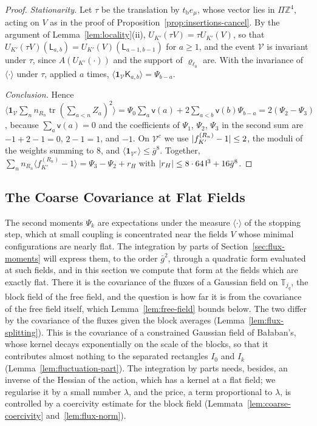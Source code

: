 \documentclass[11pt]{preprint}
\newcommand{\tr}{\operatorname{tr}}
\DeclarePairedDelimiter{\abs}{\lvert}{\rvert}
\numberwithin{equation}{section}
\theoremstyle{definition}
\theoremstyle{remark}
\theoremstyle{plain}
\begin{document}
\begin{proof}
\emph{Stationarity.} Let $\tau$ be the translation by $t_{\mathrm b}e_\mu$, whose vector lies in $\Pi\mathbb Z^4$, acting on $V$ as in the proof of Proposition~\ref{prop:insertions-cancel}. By the argument of Lemma~\ref{lem:locality}(ii), $U_{K'}(\tau V) = \tau U_{K'}(V)$, so that $U_{K'}(\tau V)(\mathsf L_{a,b}) = U_{K'}(V)(\mathsf L_{a-1,b-1})$ for $a \geq 1$, and the event $\mathcal V$ is invariant under $\tau$, since $A(U_{K'}(\cdot))$ and the support of $\varrho_{\ell_0}$ are. With the invariance of $\langle\cdot\rangle$ under $\tau$, applied $a$ times, $\langle\mathbf 1_{\mathcal V}\mathsf K_{a,b}\rangle = \Psi_{b-a}$.

\emph{Conclusion.} Hence $\langle\mathbf 1_{\mathcal V}\sum_nn_{R_n}\tr(\sum_{a<n}Z_a)^2\rangle = \Psi_0\sum_a\mathsf v(a) + 2\sum_{a<b}\mathsf v(b)\Psi_{b-a} = 2(\Psi_2 - \Psi_3)$, because $\sum_a\mathsf v(a) = 0$ and the coefficients of $\Psi_1$, $\Psi_2$, $\Psi_3$ in the second sum are $-1 + 2 - 1 = 0$, $2 - 1 = 1$, and $-1$. On $\mathcal V^c$ we use $\abs{f^{(R_n)}_{K'} - 1} \leq 2$, the moduli of the weights summing to $8$, and $\langle\mathbf 1_{\mathcal V^c}\rangle \leq \bar g^8$. Together, $\sum_nn_{R_n}\langle f^{(R_n)}_{K'} - 1\rangle = \Psi_3 - \Psi_2 + r_H$ with $\abs{r_H} \leq 8 \cdot 64\,\mathsf l^3 + 16\bar g^8$.
\end{proof}

\subsection{The Coarse Covariance at Flat Fields}\label{sec:flat-covariance}

The second moments $\Psi_k$ are expectations under the measure $\langle\cdot\rangle$ of the stopping step, which at small coupling is concentrated near the fields $V$ whose minimal configurations are nearly flat. The integration by parts of Section~\ref{sec:flux-moments} will express them, to the order $\bar g^2$, through a quadratic form evaluated at such fields, and in this section we compute that form at the fields which are exactly flat. There it is the covariance of the fluxes of a Gaussian field on $\mathbb T_{j_q}$, the block field of the free field, and the question is how far it is from the covariance of the free field itself, which Lemma~\ref{lem:free-field} bounds below. The two differ by the covariance of the fluxes given the block averages (Lemma~\ref{lem:flux-splitting}). This is the covariance of a constrained Gaussian field of Ba{\l}aban's, whose kernel decays exponentially on the scale of the blocks, so that it contributes almost nothing to the separated rectangles $I_0$ and $I_k$ (Lemma~\ref{lem:fluctuation-part}). The integration by parts needs, besides, an inverse of the Hessian of the action, which has a kernel at a flat field; we regularise it by a small number $\lambda$, and the price, a term proportional to $\lambda$, is controlled by a coercivity estimate for the block field (Lemmata~\ref{lem:coarse-coercivity} and~\ref{lem:flux-norm}).
\end{document}
